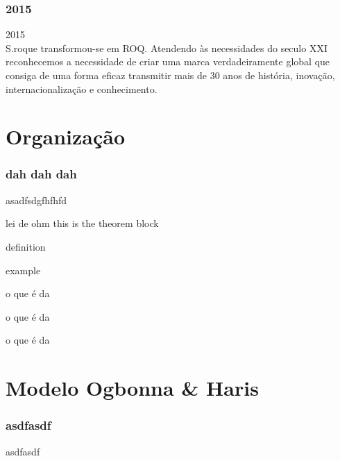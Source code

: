 \begin{frame}
\frametitle{2015}
{\Huge 2015}\\
S.roque transformou-se em ROQ. Atendendo às necessidades do seculo XXI reconhecemos a necessidade de criar uma marca verdadeiramente global que consiga de uma forma eficaz transmitir mais de 30 anos de história, inovação, internacionalização e conhecimento.
\end{frame}

\section{Organização}
\begin{frame}
\frametitle{dah dah dah}

asadfsdgfhfhfd

\begin{theorem}{lei de ohm}
this is the theorem block
\end{theorem}
\begin{definition}
definition
\end{definition}
\begin{example}
example
\end{example}

\end{frame}
\begin{frame}

\begin{block}{o que é}
da
\end{block}
\begin{alertblock}{o que é}
da
\end{alertblock}
\begin{exampleblock}{o que é}
da
\end{exampleblock}

\end{frame}
\section{Modelo Ogbonna \& Haris}
\begin{frame}
\frametitle{asdfasdf}

asdfasdf

\end{frame}
